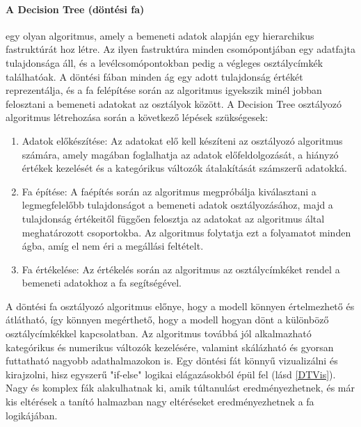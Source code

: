 \documentclass[acmtog, authorversion]{acmart}
\begin{document}
\paragraph{A Decision Tree (döntési fa)} egy olyan algoritmus, amely a bemeneti adatok alapján egy hierarchikus fastruktúrát hoz létre. Az ilyen fastruktúra minden csomópontjában egy adatfajta tulajdonsága áll, és a levélcsomópontokban pedig a végleges osztálycímkék találhatóak. A döntési fában minden ág egy adott tulajdonság értékét reprezentálja, és a fa felépítése során az algoritmus igyekszik minél jobban felosztani a bemeneti adatokat az osztályok között.
A Decision Tree osztályozó algoritmus létrehozása során a következő lépések szükségesek:
\begin{enumerate}
    \item Adatok előkészítése: Az adatokat elő kell készíteni az osztályozó algoritmus számára, amely magában foglalhatja az adatok előfeldolgozását, a hiányzó értékek kezelését és a kategórikus változók átalakítását számszerű adatokká.
    \item Fa építése: A faépítés során az algoritmus megpróbálja kiválasztani a legmegfelelőbb tulajdonságot a bemeneti adatok osztályozásához, majd a tulajdonság értékeitől függően felosztja az adatokat az algoritmus által meghatározott csoportokba. Az algoritmus folytatja ezt a folyamatot minden ágba, amíg el nem éri a megállási feltételt.
    \item Fa értékelése: Az értékelés során az algoritmus az osztálycímkéket rendel a bemeneti adatokhoz a fa segítségével.
\end{enumerate}
A döntési fa osztályozó algoritmus előnye, hogy a modell könnyen értelmezhető és átlátható, így könnyen megérthető, hogy a modell hogyan dönt a különböző osztálycímkékkel kapcsolatban. Az algoritmus továbbá jól alkalmazható kategórikus és numerikus változók kezelésére, valamint skálázható és gyorsan futtatható nagyobb adathalmazokon is.
Egy döntési fát könnyű vizualizálni és kirajzolni, hisz egyszerű "if-else" logikai elágazásokból épül fel (lásd \ref{DTVis}). Nagy és komplex fák alakulhatnak ki, amik túltanulást eredményezhetnek, és már kis eltérések a tanító halmazban nagy eltéréseket eredményezhetnek a fa logikájában.
\end{document}
